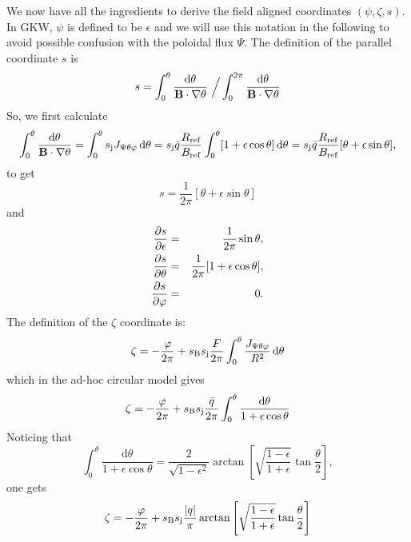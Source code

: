 We now have all the ingredients to derive the field aligned coordinates $(\psi,\zeta,s)$. In GKW, $\psi$ is defined to be $\epsilon$ and we will use this notation in the following to avoid possible
confusion with the poloidal flux $\Psi$. The definition of the parallel coordinate $s$ is
\begin{equation}
 s = \int_0^\theta \frac{\textrm{d}\theta}{\mathbf{B}\cdot\nabla\theta} \,\,\Big{/} \int_0^{2\pi} \frac{\textrm{d}\theta}{\mathbf{B}\cdot\nabla\theta}
\end{equation}
So, we first calculate
\begin{equation}
 \int_0^\theta \frac{\textrm{d}\theta}{\mathbf{B}\cdot\nabla\theta} = \int_0^\theta s_{\mathrm{j}}J_{\Psi\theta\varphi}\,\textrm{d}\theta = s_{\mathrm{j}}\bar{q}\frac{R_{\mathrm{ref}}}{B_{\mathrm{ref}}} \int_0^\theta
[1+\epsilon\cos\theta]\,\textrm{d}\theta = s_{\mathrm{j}}\bar{q}\frac{R_{\mathrm{ref}}}{B_{\mathrm{ref}}} [\theta + \epsilon \sin\theta],
\end{equation}
to get
\begin{equation}
 s=\frac{1}{2\pi}[\theta + \epsilon\sin\theta]
\label{eq:s:def}
\end{equation}
and
\begin{eqnarray}
 \frac{\partial s}{\partial \epsilon} &=& \frac{1}{2\pi}\sin\theta, \\
 \frac{\partial s}{\partial \theta} &=& \frac{1}{2\pi}[1+\epsilon\cos\theta],\\
 \frac{\partial s}{\partial \varphi} &=& 0.
\end{eqnarray}
The definition of the $\zeta$ coordinate is:
\begin{equation}
 \zeta = - \frac{\varphi}{2\pi} + s_{\mathrm{B}}s_{\mathrm{j}}\frac{F}{2\pi}\int_0^\theta \frac{J_{\Psi\theta\varphi}}{R^2}\,\textrm{d}\theta 
\end{equation}
which in the ad-hoc circular model gives
\begin{equation}
 \zeta = - \frac{\varphi}{2\pi} + s_{\mathrm{B}}s_{\mathrm{j}}\frac{\bar{q}}{2\pi}\int_0^\theta \frac{\textrm{d}\theta}{1+\epsilon\cos\theta}
\end{equation}
Noticing that
\begin{equation}
 \int_0^\theta \frac{\textrm{d}\theta}{1+\epsilon\cos\theta} = \frac{2}{\sqrt{1-\epsilon^2}}\arctan\left[ \sqrt{\frac{1-\epsilon}{1+\epsilon}}\tan \frac{\theta}{2}\right],
\end{equation}
one gets
\begin{equation}
 \zeta = - \frac{\varphi}{2\pi} + s_{\mathrm{B}}s_{\mathrm{j}}\frac{|q|}{\pi}\arctan\left[ \sqrt{\frac{1-\epsilon}{1+\epsilon}}\tan \frac{\theta}{2}\right]
 \label{eq:def:zeta}
\end{equation}
